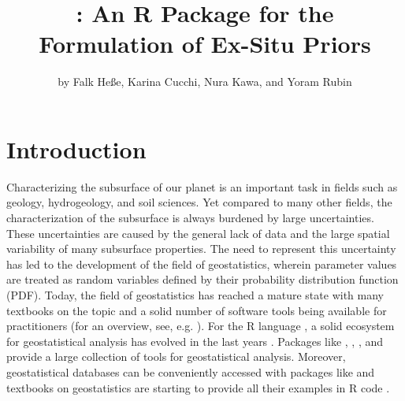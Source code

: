\title{: An R Package for the Formulation of Ex-Situ Priors}
\author{by Falk He{\ss}e, Karina Cucchi, Nura Kawa, and Yoram Rubin}

\maketitle


\section{Introduction}\label{sec:Introduction}

Characterizing the subsurface of our planet is an important task in fields such as geology, hydrogeology, and soil sciences. Yet compared to many other fields, the characterization of the subsurface is always burdened by large uncertainties. 
These uncertainties are caused by the general lack of data and the large spatial variability of many subsurface properties. 
The need to represent this uncertainty has led to the development of the field of geostatistics, wherein parameter values are treated as random variables defined by their probability distribution function (PDF). 
Today, the field of geostatistics has reached a mature state with many textbooks on the topic \citep{Pyrcz2002, Rubin2003, Kitanidis2008} and a solid number of software tools being available for practitioners (for an overview, see, e.g. \citet{Rubin2018}). 
For the R language \citep{R2014}, a solid ecosystem for geostatistical analysis has evolved in the last years \citep{Slater2019}. 
Packages like  \citep{Ribeiro2001},  \citep{Pebesma2004},  \citep{georob}, and  \citep{rgeostats_software} provide a large collection of tools for geostatistical analysis. Moreover, geostatistical databases can be conveniently accessed with packages like  \citep{Beaudette2013} and textbooks on geostatistics are starting to provide all their examples in R code \citep{Diggle2007, Banerjee2014}.

